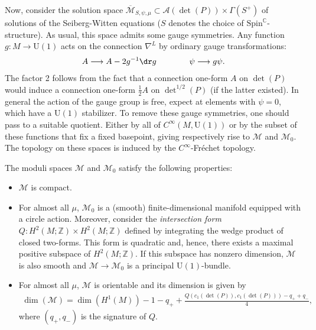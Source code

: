     Now, consider the solution space $\overline{\mathcal{M}}_{S,\psi,\mu}\subset\mathcal{A}(\det(P))\times\Gamma(S^+)$ of solutions of the Seiberg-Witten equations ($S$ denotes the choice of $\mathrm{Spin}^\mathbb{C}$-structure). As usual, this space admits some gauge symmetries. Any function $g:M\rightarrow\mathrm{U}(1)$ acts on the connection $\nabla^L$ by ordinary gauge transformations:
    \begin{gather}
        A\longrightarrow A-2g^{-1}\dr g\qquad\qquad\psi\longrightarrow g\psi.
    \end{gather}
    The factor 2 follows from the fact that a connection one-form $A$ on $\det(P)$ would induce a connection one-form $\frac{1}{2}A$ on $\det^{1/2}(P)$ (if the latter existed). In general the action of the gauge group is free, expect at elements with $\psi=0$, which have a $\mathrm{U}(1)$ stabilizer. To remove these gauge symmetries, one should pass to a suitable quotient. Either by all of $C^\infty(M,\mathrm{U}(1))$ or by the subset of these functions that fix a fixed basepoint, giving respectively rise to $\mathcal{M}$ and $\mathcal{M}_0$. The topology on these spaces is induced by the $C^\infty$-Fr\'echet topology.

    \begin{property}
        The moduli spaces $\mathcal{M}$ and $\mathcal{M}_0$ satisfy the following properties:
        \begin{itemize}
            \item $\mathcal{M}$ is compact.
            \item For almost all $\mu$, $\mathcal{M}_0$ is a (smooth) finite-dimensional manifold equipped with a circle action. Moreover, consider the \textit{intersection form} $Q:H^2(M;\mathbb{Z})\times H^2(M;\mathbb{Z})$ defined by integrating the wedge product of closed two-forms. This form is quadratic and, hence, there exists a maximal positive subspace of $H^2(M;\mathbb{Z})$. If this subspace has nonzero dimension, $\mathcal{M}$ is also smooth and $\mathcal{M}\rightarrow\mathcal{M}_0$ is a principal $\mathrm{U}(1)$-bundle.
            \item For almost all $\mu$, $\mathcal{M}$ is orientable and its dimension is given by
                \begin{gather}
                    \dim(\mathcal{M}) = \dim(H^1(M)) - 1 - q_+ + \frac{Q(c_1(\det(P)),c_1(\det(P)))-q_++q_-}{4},
                \end{gather}
                where $(q_+,q_-)$ is the signature of $Q$.
        \end{itemize}
    \end{property}

